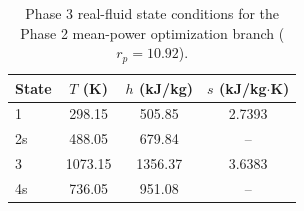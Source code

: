\begin{table}[htbp]
    \centering
    \caption{Phase 3 real-fluid state conditions for the Phase 2 mean-power optimization branch ($r_p = 10.92$).}
    \label{tab:phase3_state_conditions_phase2_optimization}
    \begin{tabular}{lccc}
        \hline
        State & $T$ (K) & $h$ (kJ/kg) & $s$ (kJ/kg$\cdot$K) \\
        \hline
        1 & 298.15 & 505.85 & 2.7393 \\
        2s & 488.05 & 679.84 & -- \\
        3 & 1073.15 & 1356.37 & 3.6383 \\
        4s & 736.05 & 951.08 & -- \\
        \hline
    \end{tabular}
\end{table}